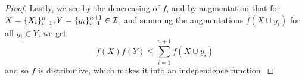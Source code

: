 \begin{proof}
    Lastly, we see by the deacreasing of  $f$, and by augmentation that for  $X=\{X_i\}_{i=1}^n,
    Y=\{y_i\}_{i=1}^{n+1} \in \mathcal{I}$, and summing the augmentations $f(X \cup y_i)$ for all $y_i \in
    Y$, we get
        \begin{equation*}
            f(X)f(Y) \leq \sum_{i=1}^{n+1}{f(X \cup y_i)}
        \end{equation*}
        and so $f$ is distributive, which makes it into an independence function.
\end{proof}
